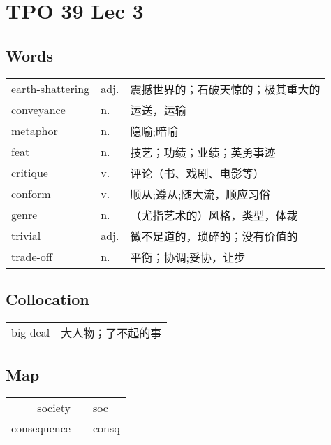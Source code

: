 \section{TPO 39 Lec 3}

\subsection{Words}

\begin{tabular}{lll}
    earth-shattering & adj. & 震撼世界的；石破天惊的；极其重大的 \\
    conveyance       & n.   & 运送，运输             \\
    metaphor         & n.   & 隐喻;暗喻             \\
    feat             & n.   & 技艺；功绩；业绩；英勇事迹     \\
    critique         & v.   & 评论（书、戏剧、电影等）      \\
    conform          & v.   & 顺从;遵从;随大流，顺应习俗    \\
    genre            & n.   & （尤指艺术的）风格，类型，体裁   \\
    trivial          & adj. & 微不足道的，琐碎的；没有价值的   \\
    trade-off        & n.   & 平衡；协调;妥协，让步       \\
\end{tabular}

\subsection{Collocation}

\begin{tabular}{ll}
    big deal & 大人物；了不起的事 \\
\end{tabular}

\subsection{Map}

\begin{tabular}{rc@{\quad$\to$\quad}l}
    society     &  & soc   \\
    consequence &  & consq \\
\end{tabular}
